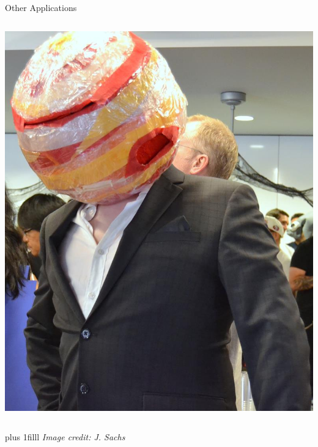 \documentclass{beamer}
\newcommand{\btVFill}{\vskip0pt plus 1filll}
\begin{document}
\begin{frame}{Other Applications}
\begin{columns}
\begin{column}{0.48\textwidth}
{        \includegraphics{mr_jupiter.jpg}
}
    \end{column}
\end{columns}
\btVFill
\textit{\scriptsize Image credit: J. Sachs}
\end{frame}
\end{document}
